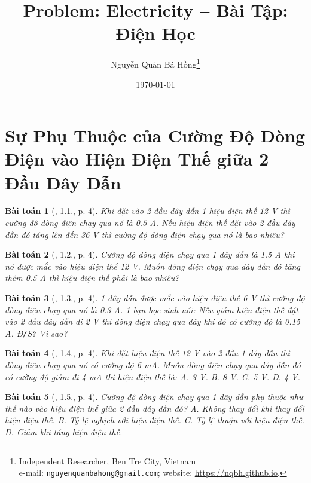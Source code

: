 \documentclass{article}
\title{Problem: Electricity -- Bài Tập: Điện Học}
\author{Nguyễn Quản Bá Hồng\footnote{Independent Researcher, Ben Tre City, Vietnam\\e-mail: \texttt{nguyenquanbahong@gmail.com}; website: \url{https://nqbh.github.io}.}}
\date{\today}
\newtheorem{baitoan}{Bài toán}
\begin{document}
\maketitle
\begin{abstract}
	
\end{abstract}
\tableofcontents
\newpage


\section{Sự Phụ Thuộc của Cường Độ Dòng Điện vào Hiện Điện Thế giữa 2 Đầu Dây Dẫn}

\begin{baitoan}[\cite{SBT_Vat_Ly_9}, 1.1., p. 4]
	Khi đặt vào 2 đầu dây dẫn 1 hiệu điện thế \emph{12 V} thì cường độ dòng điện chạy qua nó là \emph{0.5 A}. Nếu hiệu điện thế đặt vào 2 đầu dây dẫn đó tăng lên đến \emph{36 V} thì cường độ dòng điện chạy qua nó là bao nhiêu?
\end{baitoan}

\begin{baitoan}[\cite{SBT_Vat_Ly_9}, 1.2., p. 4]
	Cường độ dòng điện chạy qua 1 dây dẫn là \emph{1.5 A} khi nó được mắc vào hiệu điện thế \emph{12 V}. Muốn dòng điện chạy qua dây dẫn đó tăng thêm \emph{0.5 A} thì hiệu điện thế phải là bao nhiêu?
\end{baitoan}

\begin{baitoan}[\cite{SBT_Vat_Ly_9}, 1.3., p. 4]
	1 dây dẫn được mắc vào hiệu điện thế \emph{6 V} thì cường độ dòng điện chạy qua nó là \emph{0.3 A}. 1 bạn học sinh nói: Nếu giảm hiệu điện thế đặt vào 2 đầu dây dẫn đi \emph{2 V} thì dòng điện chạy qua dây khi đó có cường độ là \emph{0.15 A}. \emph{Đ\texttt{/}S?} Vì sao?
\end{baitoan}

\begin{baitoan}[\cite{SBT_Vat_Ly_9}, 1.4., p. 4]
	Khi đặt hiệu điện thế \emph{12 V} vào 2 đầu 1 dây dẫn thì dòng điện chạy qua nó có cường độ \emph{6 mA}. Muốn dòng điện chạy qua dây dẫn đó có cường độ giảm đi \emph{4 mA} thì hiệu điện thế là: {\sf A.} \emph{3 V}. {\sf B.} \emph{8 V}. {\sf C.} \emph{5 V}. {\sf D.} \emph{4 V}.
\end{baitoan}

\begin{baitoan}[\cite{SBT_Vat_Ly_9}, 1.5., p. 4]
	Cường độ dòng điện chạy qua 1 dây dẫn phụ thuộc như thế nào vào hiệu điện thế giữa 2 đầu dây dẫn đó? {\sf A.} Không thay đổi khi thay đổi hiệu điện thế. {\sf B.} Tỷ lệ nghịch với hiệu điện thế. {\sf C.} Tỷ lệ thuận với hiệu điện thế. {\sf D.} Giảm khi tăng hiệu điện thế.
\end{baitoan}
\end{document}
